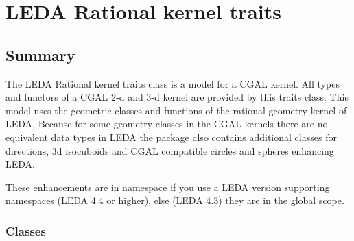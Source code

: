 

\ccParDims


\chapter{LEDA Rational kernel traits}

\section*{Summary}

The LEDA Rational kernel traits class is a model for a CGAL kernel.
All types and functors of a CGAL 2-d and 3-d kernel are provided by
this traits class.
This model uses the geometric classes and functions of the rational geometry kernel
of LEDA. Because for some geometry classes in the CGAL kernels there are no equivalent
data types in LEDA the package also contains additional classes for directions, 3d isocuboids
and CGAL compatible circles and spheres enhancing LEDA.

These enhancements are in namespace  if you use a LEDA version supporting namespaces
(LEDA 4.4 or higher), else (LEDA 4.3) they are in the global scope.

\subsection*{Classes}
\\
\\
\\
\\
\\

